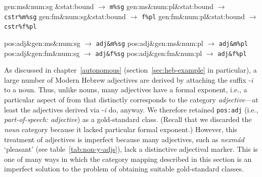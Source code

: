 {\begin{description}
\begin{exe}
\ex \label{ex:cstr-cats} 
\begin{xlist}
		\ex gen:ms\&num:sg \&stat:bound \quad $\to$ \quad \texttt{m\%sg} \label{ex:cstr:m-sg}
		\ex gen:ms\&num:pl\&stat:bound \quad $\to$ \quad \texttt{cstr\%m\%sg} \label{ex:cstr:m-pl}
		\ex gen:fm\&num:sg\&stat:bound  \quad $\to$ \quad \texttt{f\%pl} \label{ex:cstr:f-sg}
		\ex gen:fm\&num:pl\&stat:bound \quad $\to$ \quad \texttt{cstr\%f\%pl} \label{ex:cstr:f-pl}
	\end{xlist}
\ex \label{ex:adj-cats} 
\begin{xlist}
		\ex pos:adj\&gen:ms\&num:sg \quad $\to$ \quad \texttt{adj\&m\%sg} \label{ex:adj:m-sg}
		\ex pos:adj\&gen:ms\&num:pl \quad $\to$ \quad \texttt{adj\&m\%pl} \label{ex:adj:m-pl}
		\ex pos:adj\&gen:fm\&num:sg \quad $\to$ \quad \texttt{adj\&f\%sg} \label{ex:adj:f-sg}
		\ex pos:adj\&gen:fm\&num:pl \quad $\to$ \quad \texttt{adj\&f\%pl} \label{ex:adj:f-pl}
	\end{xlist}
\end{exe}

\item[Adjectives.]
As discussed in chapter~\ref{autonomous} (section~\ref{sec:heb-example} in particular), 
a large number of Modern Hebrew adjectives are derived by attaching the 
suffix -\textit{i}
to a noun. Thus, unlike nouns, many adjectives have a formal exponent, i.e., a particular aspect of from that distinctly corresponds to the category \emph{adjective}---at least the adjectives derived via -\textit{i} do, anyway. 
We therefore retained
\texttt{pos:adj} (i.e., \textit{part-of-speech: adjective}) as a gold-standard class.
(Recall that we discarded the \emph{noun} category because it lacked particular formal exponent.) 
However, this treatment of adjectives is imperfect because many adjectives, such as
\textit{nexm\'{a}d} `pleasant' (see table~\ref{tab:non-y-adjs}),
lack a distinctive adjectival marker.  This is one of many ways in which the category mapping described in this section is an imperfect solution to the problem of obtaining suitable gold-standard classes.  
 

\end{description}}
